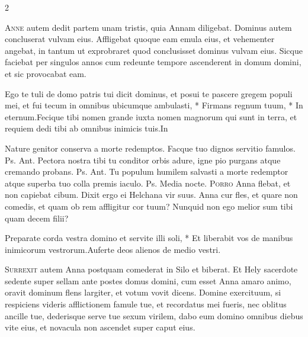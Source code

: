 \begin{multicols*}{2}
\begin{responsory}
\end{responsory}%
\lettrine[lines=2]{\zallmancaps \color{Blue} A}{nne} autem dedit partem unam tristis, quia Annam diligebat. Dominus autem concluserat vulvam eius. Affligebat quoque eam emula eius, et vehementer angebat, in tantum ut exprobraret quod conclusisset dominus vulvam eius. Sicque faciebat per singulos annos cum redeunte tempore ascenderent in domum domini, et sic provocabat eam.
\begin{responsory-final}
{Ego te tuli de domo patris tui dicit dominus, et posui te pascere gregem populi mei, et fui tecum in omnibus ubicumque ambulasti, * Firmans regnum tuum, * In eternum.}{Fecique tibi nomen grande iuxta nomen magnorum qui sunt in terra, et requiem dedi tibi ab omnibus inimicis tuis.}{In}
\end{responsory-final}%
 Nature genitor conserva a morte redemptos. Facque tuo dignos servitio famulos. {\color{Red} Ps.}  {\color{Red} Ant.} Pectora nostra tibi tu conditor orbis adure, igne pio purgans atque cremando probans. {\color{Red} Ps.}  {\color{Red} Ant.} Tu populum humilem salvasti a morte redemptor atque superba tuo colla premis iaculo. {\color{Red} Ps.}  \V Media nocte.
\lettrine[lines=2]{\zallmancaps \color{Red} P}{orro} Anna flebat, et non capiebat cibum. Dixit ergo ei Helchana vir suus. Anna cur fles, et quare non comedis, et quam ob rem affligitur cor tuum? Nunquid non ego melior sum tibi quam decem filii?
\begin{responsory}
{Preparate corda vestra domino et servite illi soli, * Et liberabit vos de manibus inimicorum vestrorum.}{Auferte deos alienos de medio vestri.}
\end{responsory}%
\lettrine[lines=2]{\zallmancaps \color{Blue} S}{urrexit} autem Anna postquam comederat in Silo et biberat. Et Hely sacerdote sedente super sellam ante postes domus domini, cum esset Anna amaro animo, oravit dominum flens largiter, et votum vovit dicens. Domine exercituum, si respiciens videris afflictionem famule tue, et recordatus mei fueris, nec oblitus ancille tue, dederisque serve tue sexum virilem, dabo eum domino omnibus diebus vite eius, et novacula non ascendet super caput eius.

\end{multicols*}
